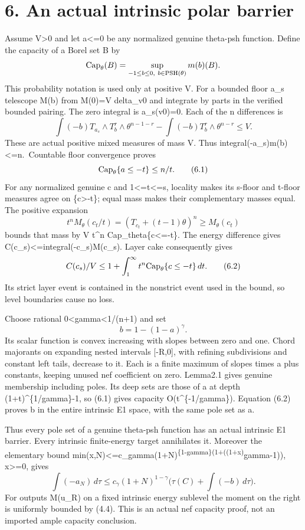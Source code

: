 \documentclass[
  10pt,
]{article}
\begin{document}
\section{6. An actual intrinsic polar
barrier}\label{an-actual-intrinsic-polar-barrier}

Assume V\textgreater0 and let a\textless=0 be any normalized genuine
theta-psh function. Define the capacity of a Borel set B by \[
 {\rm Cap}_\theta(B)=\sup_{-1\le b\le0,\ b\in{\rm PSH}(\theta)}m(b)(B).
\] This probability notation is used only at positive V. For a bounded
floor a\_s telescope M(b) from M(0)=V delta\_v0 and integrate by parts
in the verified bounded pairing. The zero integral is a\_s(v0)=0. Each
of the n differences is \[
 \int(-b)T_{a_s}\wedge T_b^r\wedge\theta^{n-1-r}
 -\int(-b)T_b^r\wedge\theta^{n-r}\le V.
\] These are actual positive mixed measures of mass V. Thus
integral(-a\_s)m(b)\textless=n.~Countable floor convergence proves \[
 {\rm Cap}_\theta\{a\le-t\}\le n/t.                                     \tag{6.1}
\] For any normalized genuine c and 1\textless=t\textless=s, locality
makes its s-floor and t-floor measures agree on \{c\textgreater-t\};
equal mass makes their complementary masses equal. The positive
expansion \[
 t^nM_\theta(c_t/t)=(T_{c_t}+(t-1)\theta)^n\ge M_\theta(c_t)
\] bounds that mass by V t\^{}n Cap\_theta\{c\textless=-t\}. The energy
difference gives C(c\_s)\textless=integral(-c\_s)M(c\_s). Layer cake
consequently gives \[
 C(c_s)/V\le1+\int_1^\infty t^n{\rm Cap}_\theta\{c\le-t\}\,dt.             \tag{6.2}
\] Its strict layer event is contained in the nonstrict event used in
the bound, so level boundaries cause no loss.

Choose rational 0\textless gamma\textless1/(n+1) and set \[
 b=1-(1-a)^\gamma.                                                     \tag{6.3}
\] Its scalar function is convex increasing with slopes between zero and
one. Chord majorants on expanding nested intervals {[}-R,0{]}, with
refining subdivisions and constant left tails, decrease to it. Each is a
finite maximum of slopes times a plus constants, keeping unused nef
coefficient on zero. Lemma2.1 gives genuine membership including poles.
Its deep sets are those of a at depth (1+t)\^{}\{1/gamma\}-1, so (6.1)
gives capacity O(t\^{}\{-1/gamma\}). Equation (6.2) proves b in the
entire intrinsic E1 space, with the same pole set as a.

Thus every pole set of a genuine theta-psh function has an actual
intrinsic E1 barrier. Every intrinsic finite-energy target annihilates
it. Moreover the elementary bound
min(x,N)\textless=c\_gamma(1+N)\textsuperscript{\{1-gamma\}(1+((1+x)}gamma-1)),
x\textgreater=0, gives \[
 \int(-a_N)\,d\tau\le c_\gamma(1+N)^{1-\gamma}
                 \bigl(\tau(C)+\int(-b)\,d\tau\bigr).                   \tag{6.4}
\] For outputs M(u\_R) on a fixed intrinsic energy sublevel the moment
on the right is uniformly bounded by (4.4). This is an actual nef
capacity proof, not an imported ample capacity conclusion.
\end{document}
